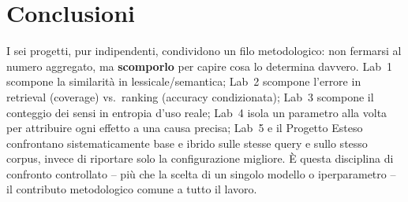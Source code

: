 \documentclass[11pt,a4paper]{article}
\begin{document}
\section{Conclusioni}

I sei progetti, pur indipendenti, condividono un filo metodologico: non fermarsi al numero aggregato, ma \textbf{scomporlo} per capire cosa lo determina davvero. Lab~1 scompone la similarità in lessicale/semantica; Lab~2 scompone l'errore in retrieval (coverage) vs.\ ranking (accuracy condizionata); Lab~3 scompone il conteggio dei sensi in entropia d'uso reale; Lab~4 isola un parametro alla volta per attribuire ogni effetto a una causa precisa; Lab~5 e il Progetto Esteso confrontano sistematicamente base e ibrido sulle stesse query e sullo stesso corpus, invece di riportare solo la configurazione migliore. È questa disciplina di confronto controllato -- più che la scelta di un singolo modello o iperparametro -- il contributo metodologico comune a tutto il lavoro.
\end{document}
